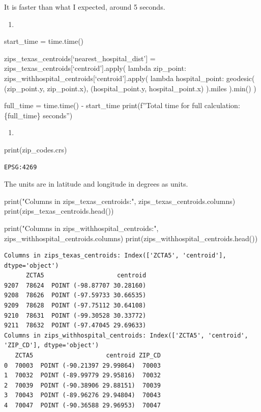 \documentclass[
  letterpaper,
  DIV=11,
  numbers=noendperiod]{scrartcl}
\newenvironment{Shaded}{\begin{snugshade}}{\end{snugshade}}
\newcommand{\BuiltInTok}[1]{\textcolor[rgb]{0.00,0.23,0.31}{#1}}
\newcommand{\NormalTok}[1]{\textcolor[rgb]{0.00,0.23,0.31}{#1}}
\newcommand{\StringTok}[1]{\textcolor[rgb]{0.13,0.47,0.30}{#1}}
\providecommand{\tightlist}{%
  \setlength{\itemsep}{0pt}\setlength{\parskip}{0pt}}\usepackage{longtable,booktabs,array}
\begin{document}
It is faster than what I expected, around 5 seconds.

\begin{enumerate}
\def\labelenumi{\alph{enumi}.}
\setcounter{enumi}{1}
\tightlist
\item
\end{enumerate}

start\_time = time.time()

zips\_texas\_centroids{[}`nearest\_hospital\_dist'{]} =
zips\_texas\_centroids{[}`centroid'{]}.apply( lambda zip\_point:
zips\_withhospital\_centroids{[}`centroid'{]}.apply( lambda
hospital\_point: geodesic( (zip\_point.y, zip\_point.x),
(hospital\_point.y, hospital\_point.x) ).miles ).min() )

full\_time = time.time() - start\_time print(f''Total time for full
calculation: \{full\_time\} seconds'')

\begin{enumerate}
\def\labelenumi{\alph{enumi}.}
\setcounter{enumi}{2}
\tightlist
\item
\end{enumerate}

\begin{Shaded}
\begin{Highlighting}[]
\BuiltInTok{print}\NormalTok{(zip\_codes.crs)}
\end{Highlighting}
\end{Shaded}

\begin{verbatim}
EPSG:4269
\end{verbatim}

The units are in latitude and longitude in degrees as units.

\begin{Shaded}
\begin{Highlighting}[]
\BuiltInTok{print}\NormalTok{(}\StringTok{"Columns in zips\_texas\_centroids:"}\NormalTok{, zips\_texas\_centroids.columns)}
\BuiltInTok{print}\NormalTok{(zips\_texas\_centroids.head())}

\BuiltInTok{print}\NormalTok{(}\StringTok{"Columns in zips\_withhospital\_centroids:"}\NormalTok{, zips\_withhospital\_centroids.columns)}
\BuiltInTok{print}\NormalTok{(zips\_withhospital\_centroids.head())}
\end{Highlighting}
\end{Shaded}

\begin{verbatim}
Columns in zips_texas_centroids: Index(['ZCTA5', 'centroid'], dtype='object')
      ZCTA5                    centroid
9207  78624  POINT (-98.87707 30.28160)
9208  78626  POINT (-97.59733 30.66535)
9209  78628  POINT (-97.75112 30.64108)
9210  78631  POINT (-99.30528 30.33772)
9211  78632  POINT (-97.47045 29.69633)
Columns in zips_withhospital_centroids: Index(['ZCTA5', 'centroid', 'ZIP_CD'], dtype='object')
   ZCTA5                    centroid ZIP_CD
0  70003  POINT (-90.21397 29.99864)  70003
1  70032  POINT (-89.99779 29.95816)  70032
2  70039  POINT (-90.38906 29.88151)  70039
3  70043  POINT (-89.96276 29.94804)  70043
4  70047  POINT (-90.36588 29.96953)  70047
\end{verbatim}
\end{document}
